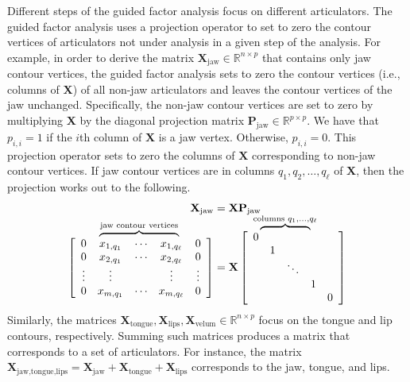 \documentclass[preprint]{JASAnew}\usepackage[]{graphicx}\usepackage[]{color}
\newcommand\bovermat[2]{%
  \makebox[0pt][l]{$\smash{\overbrace{\phantom{%
    \begin{matrix}#2\end{matrix}}}^{#1}}$}#2}
\begin{document}
Different steps of the guided factor analysis focus on different articulators.
%
The guided factor analysis uses a projection operator to set to zero the contour vertices of articulators not under analysis in a given step of the analysis.
% 
For example, in order to derive the matrix $\mathbf{X}_\text{jaw} \in \mathbb{R}^{n\times p}$ that contains only jaw contour vertices, the guided factor analysis sets to zero the contour vertices (i.e., columns of $\mathbf{X}$) of all non-jaw articulators and leaves the contour vertices of the jaw unchanged. 
%
Specifically, the non-jaw contour vertices are set to zero by multiplying $\mathbf{X}$  
% 
by the diagonal projection matrix $\mathbf{P}_\text{jaw} \in \mathbb{R}^{p\times p}$. 
% 
We have that $p_{i,i}=1$ if the $i$th column of $\mathbf{X}$ is a jaw vertex. Otherwise, $p_{i,i}=0$. 
% 
This projection operator sets to zero the columns of $\mathbf{X}$ corresponding to non-jaw contour vertices. 
% 
If jaw contour vertices are in columns $q_1,q_2,\ldots,q_\ell$ of $\mathbf{X}$, then the projection works out to the following. 
% 
\begin{equation}
\begin{split}
  \mathbf{X}_\text{jaw} &= \mathbf{X} \mathbf{P}_\text{jaw} \\[10pt]
%
  \left[ {\begin{array}{ccccc}
   0 & \bovermat{\text{jaw contour vertices}}{x_{1,q_1} &  \cdots & x_{1,q_\ell}} & 0 \\
   0 & x_{2,q_1} &  \cdots & x_{2,q_\ell} & 0 \\
   \vdots & \vdots & & \vdots & \vdots \\
   0 & x_{m,q_1} & \cdots & x_{m,q_\ell} & 0 \\
  \end{array} } \right]
%
  &= 
%
   \mathbf{X}
%
   \left[ {\begin{array}{ccccc}
   \bovermat{\text{columns } q_1,\ldots,q_\ell}{0&&&&}\\
   & 1 &&&\\
   && \ddots &&\\
   &&& 1 &\\
   &&&& 0 \\
  \end{array} } \right]
\end{split}
\end{equation}
%
Similarly, the matrices $\mathbf{X}_\text{tongue},\mathbf{X}_\text{lips},\mathbf{X}_\text{velum} \in \mathbb{R}^{n\times p}$ focus on the tongue and lip contours, respectively. 
% 
Summing such matrices produces a matrix that corresponds to a set of articulators. For instance, the matrix $\mathbf{X}_{\text{jaw,tongue,lips}} = \mathbf{X}_\text{jaw} + \mathbf{X}_\text{tongue} + \mathbf{X}_\text{lips}$ corresponds to the jaw, tongue, and lips.
\end{document}
